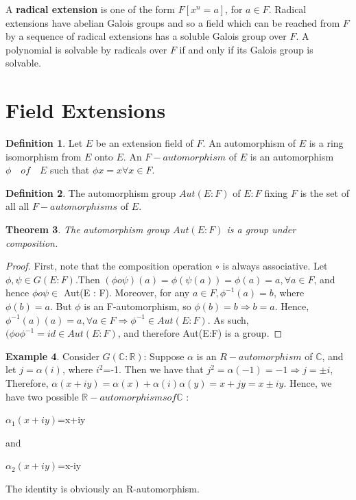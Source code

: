\documentclass[12pt]{article}
\newtheorem{thm}{Theorem}[section]
\theoremstyle{definition}
\newtheorem{defn}[thm]{Definition}
\newtheorem{exmp}[thm]{Example}
\theoremstyle{remark}
\begin{document}
A \textbf{radical extension} is one of the form $F[x^{n} = a]$, for $a \in F$. Radical extensions have abelian Galois groups and so a field which can be reached from $F$ by a sequence of radical extensions has a soluble Galois group over $F$. A polynomial is solvable by radicals over $F$ if and only if its Galois group is solvable.

\section{Field Extensions}

\begin{defn}
 Let $E$ be an extension field of $F$. An automorphism of $E$ is a ring isomorphism from $E$ onto $E$. An $F-automorphism$ of $E$ is an automorphism $\phi \quad of \quad E $ such that $\phi{x} = x \forall{x} \in F$.
\end{defn}

\begin{defn}
The automorphism group $Aut(E : F)$ of $E : F$ fixing $F$ is the set of all all $F-automorphisms$ of $E$.
\end{defn}


\begin{thm}
The automorphism group $Aut(E : F)$ is a group under composition.
  \end{thm}
\begin{proof}
First, note that the composition operation $\circ$ is always associative. Let $\phi,\psi \in  G(E:F)$.Then $(\phi o\psi )(a) = \phi( \psi(a)) = \phi(a) = a, \forall {a} \in F$, and hence $\phi o\psi \in$ Aut(E : F). Moreover, for any $a \in F, \phi^{-1}(a) = b$, where $\phi(b) = a$. But $\phi$ is an F-automorphism, so $\phi(b) = b \Rightarrow b = a.$ Hence,$ \phi^{-1}(a)(a) = a, \forall a  \in F \Rightarrow \phi^{-1} \in Aut(E : F)$. As such, $(\phi o \phi^{-1} = id \in Aut(E : F)$, and therefore Aut(E:F) is a group.
\end{proof}


\begin{exmp}
Consider $G(\mathbb{C}:\mathbb{R})$: Suppose $\alpha$ is an $R-automorphism$ of $\mathbb{C}$, and let $j = \alpha(i)$, where $i^{2}$=-1. Then we have that $j^{2}=\alpha(-1) = -1 \Rightarrow j = \pm i$,
Therefore, $\alpha(x+iy)=\alpha(x)+\alpha(i) \alpha(y)= x + jy = x  \pm iy$. Hence, we have two possible $\mathbb{R}-automorphisms of \mathbb{C}$ :
   \begin{center}
   $\alpha_{1}(x+iy)$=x+iy
   \end{center}
      and
     \begin{center}
    $\alpha_{2}(x+iy)$=x-iy
    \end{center}
    The identity is obviously an R-automorphism.
\end{exmp}
\end{document}
